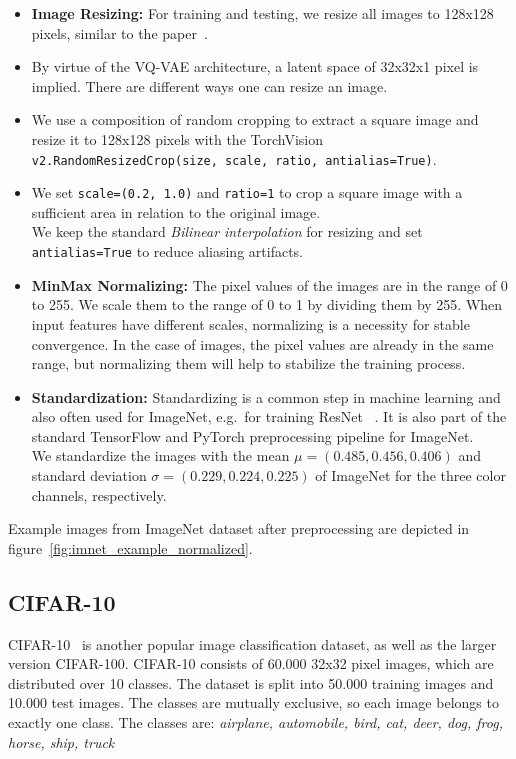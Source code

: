 \begin{itemize}
    \item \textbf{Image Resizing:}
    For training and testing, we resize all images to 128x128 pixels, similar to the paper~\cite{vqvae}.
    \item By virtue of the VQ-VAE architecture, a latent space of 32x32x1 pixel is implied.
    There are different ways one can resize an image.
    \item We use a composition of random cropping to extract a square image
    and resize it to 128x128 pixels with the TorchVision
    \texttt{v2.RandomResizedCrop(size, scale, ratio, antialias=True)}.
    \item We set \texttt{scale=(0.2, 1.0)} and \texttt{ratio=1} to crop a square image with a sufficient area in
    relation to the original image.\\
    We keep the standard \textit{Bilinear interpolation} for resizing and set \texttt{antialias=True}
    to reduce aliasing artifacts.

    \item \textbf{MinMax Normalizing:}
    The pixel values of the images are in the range of 0 to 255.
    We scale them to the range of 0 to 1 by dividing them by 255.
    When input features have different scales, normalizing is a necessity for stable convergence.
    In the case of images, the pixel values are already in the same range, but normalizing them will help to stabilize the training
    process.

    \item \textbf{Standardization:}
    Standardizing is a common step in machine learning and also often used for ImageNet, e.g.\ for training ResNet
    ~\cite{resnet}.
    It is also part of the standard TensorFlow and PyTorch preprocessing pipeline for ImageNet. \\
    We standardize the images with the mean $\mu = (0.485, 0.456, 0.406)$ and standard deviation
    $\sigma = (0.229, 0.224, 0.225)$ of ImageNet for the three color channels, respectively.

\end{itemize}

Example images from ImageNet dataset after preprocessing are depicted in figure~\ref{fig:imnet_example_normalized}.

\subsection{CIFAR-10}\label{subsec:cifar-10}
CIFAR-10~\cite{cifar10} is another popular image classification dataset, as well as the larger version CIFAR-100.
CIFAR-10 consists of 60.000
32x32 pixel images, which are distributed over 10 classes.
The dataset is split into 50.000 training images and 10.000 test images.
The classes are mutually exclusive, so each image belongs to exactly one class.
The classes are: \textit{airplane, automobile, bird, cat, deer, dog, frog, horse, ship, truck}

